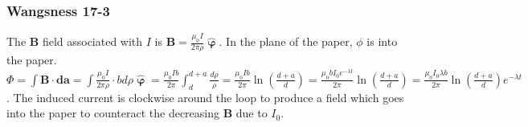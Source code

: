 \documentclass[crop=false,class=book,oneside]{standalone}
\begin{document}
            \subsubsection{Wangsness 17-3}
            The $\mathbf{B}$ field associated with $I$ is $\mathbf{B} = \frac{\mu_0 I}{2\pi \rho} \hat{\boldsymbol{\upvarphi}}$. In the plane of the paper, $\phi$ is into the paper. $\Phi = \int \mathbf{B}\cdot \mathbf{da} = \int \frac{\mu_0 I}{2\pi \rho} \cdot b d\rho \hat{\boldsymbol{\upvarphi}} = \frac{\mu_0Ib}{2\pi} \int_{d}^{d+a} \frac{d\rho}{\rho}= \frac{\mu_0 Ib}{2\pi} \ln(\frac{d+a}{d}) = \frac{\mu_0 bI_0 e^{-\lambda t}}{2\pi} \ln(\frac{d+a}{d}) = \frac{\mu_0 I_0 \lambda b}{2\pi} \ln(\frac{d+a}{d})e^{-\lambda t}$. The induced current is clockwise around the loop to produce a field which goes into the paper to counteract the decreasing $\mathbf{B}$ due to $I_0$.
\end{document}
